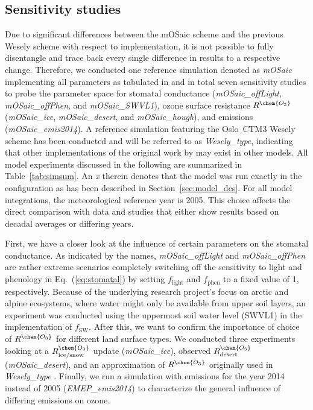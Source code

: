 \documentclass[gmd, manuscript]{copernicus}
\begin{document}
\subsection{Sensitivity studies}
\label{subsec:sens}
Due to significant differences between the mOSaic scheme and the previous Wesely scheme with respect to implementation, it is not possible to fully disentangle and trace back every single difference in results to a respective change. Therefore, we conducted one reference simulation denoted as \emph{mOSaic} implementing all parameters as tabulated in \citet{ACP:Simpson2012} and in total seven sensitivity studies to probe the parameter space for stomatal conductance (\emph{mOSaic\_offLight}, \emph{mOSaic\_offPhen}, and \emph{mOSaic\_SWVL1}), ozone surface resistance $R^\chem{O_3}$ (\emph{mOSaic\_ice}, \emph{mOSaic\_desert}, and \emph{mOSaic\_hough}), and emissions (\emph{mOSaic\_emis2014}). A reference simulation featuring the Oslo~CTM3 Wesely scheme has been conducted and will be referred to as \emph{Wesely\_type}, indicating that other implementations of the original work by \citet{AE:Wesely1989} may exist in other models.
All model experiments discussed in the following are summarized in Table~\ref{tab:simsum}. An \emph{x} therein denotes that the model was run exactly in the configuration as has been described in Section~\ref{sec:model_des}.
For all model integrations, the meteorological reference year is 2005. This choice affects the direct comparison with data and studies that either show results based on decadal averages or differing years.

First, we have a closer look at the influence of certain parameters on the stomatal conductance. As indicated by the names, \emph{mOSaic\_offLight} and \emph{mOSaic\_offPhen} are rather extreme scenarios completely switching off the sensitivity to light and phenology in Eq.~(\ref{eq:stomatal}) by setting $f_\text{light}$ and $f_\text{phen}$ to a fixed value of 1, respectively. Because of the underlying research project's focus on arctic and alpine ecosystems, where water might only be available from upper soil layers, an experiment was conducted using the uppermost soil water level (SWVL1) in the implementation of $f_\text{SW}$. 
After this, we want to confirm the importance of choice of $R^\chem{O_3}$ for different land surface types. We conducted three experiments looking at a $R^\chem{O_3}_\text{ice/snow}$ update \citep{ACP:Helmig2007} (\emph{mOSaic\_ice}), observed $R^\chem{O_3}_\text{desert}$ \citep{AE:Gusten1995} (\emph{mOSaic\_desert}), and an approximation of $R^\chem{O_3}$ originally used in \emph{Wesely\_type} \citep{AE:Wesely1989, JGR:Hough1991}.
Finally, we run a simulation with emissions for the year 2014 instead of 2005 (\emph{EMEP\_emis2014}) to characterize the general influence of differing emissions on ozone.  
\end{document}
